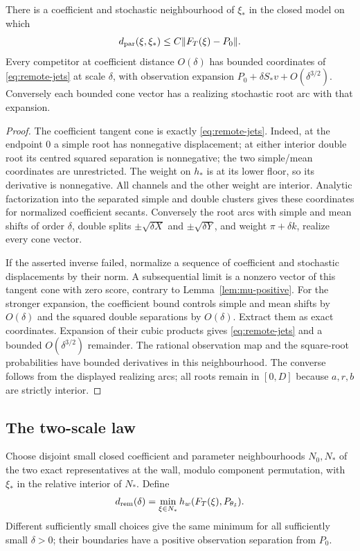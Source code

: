 \begin{lemma}\label{lem:remote-control}
There is a coefficient and stochastic neighbourhood of $\xi_*$ in the
closed model on which
\[
 d_{\rm par}(\xi,\xi_*)\le C\|F_T(\xi)-P_0\|.
\]
Every competitor at coefficient distance $O(\delta)$ has bounded
coordinates of \eqref{eq:remote-jets} at scale $\delta$, with observation
expansion $P_0+\delta S_*v+O(\delta^{3/2})$. Conversely each bounded
cone vector has a realizing stochastic root arc with that expansion.
\end{lemma}
\begin{proof}
The coefficient tangent cone is exactly \eqref{eq:remote-jets}.
Indeed, at the endpoint $0$ a simple root has nonnegative displacement;
at either interior double root its centred squared separation is
nonnegative; the two simple/mean coordinates are unrestricted. The
weight on $h_*$ is at its lower floor, so its derivative is nonnegative.
All channels and the other weight are interior. Analytic factorization
into the separated simple and double clusters gives these coordinates
for normalized coefficient secants. Conversely the root arcs with
simple and mean shifts of order $\delta$, double splits
$\pm\sqrt{\delta X}$ and $\pm\sqrt{\delta Y}$, and weight
$\pi+\delta k$, realize every cone vector.

If the asserted inverse failed, normalize a sequence of coefficient
and stochastic displacements by their norm. A subsequential limit is
a nonzero vector of this tangent cone with zero score, contrary to
Lemma~\ref{lem:mu-positive}. For the stronger expansion, the coefficient
bound controls simple and mean shifts by $O(\delta)$ and the squared
double separations by $O(\delta)$. Extract them as exact coordinates.
Expansion of their cubic products gives \eqref{eq:remote-jets} and a
bounded $O(\delta^{3/2})$ remainder. The rational observation map and
the square-root probabilities have bounded derivatives in this
neighbourhood. The converse follows from the displayed realizing arcs;
all roots remain in $[0,D]$ because $a,r,b$ are strictly interior.
\end{proof}

\subsection{The two-scale law}
Choose disjoint small closed coefficient and parameter neighbourhoods
$N_0,N_*$ of the two exact representatives at the wall, modulo component
permutation, with $\xi_*$ in the relative interior of $N_*$. Define
\begin{equation}\label{eq:drem}
 d_{\rm rem}(\delta)=\min_{\xi\in N_*}h_w(F_T(\xi),P_{\theta_\delta}).
\end{equation}
Different sufficiently small choices give the same minimum for all
sufficiently small $\delta>0$; their boundaries have a positive
observation separation from $P_0$.

